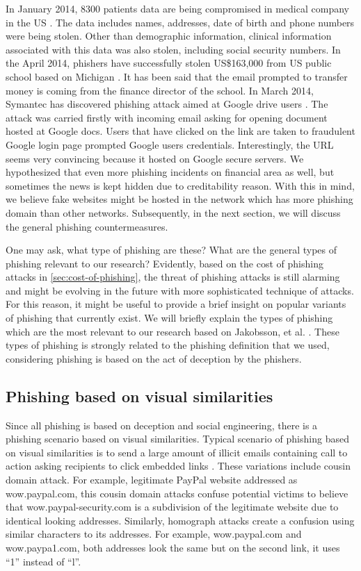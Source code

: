 In January 2014, 8300 patients data are being compromised in medical
company in the US \citep{adam:2014}. The data includes names, addresses,
date of birth and phone numbers were being stolen. Other than demographic
information, clinical information associated with this data was also
stolen, including social security numbers. In the April 2014, phishers
have successfully stolen US\$163,000 from US public school based on
Michigan \citep{ashley:2014}. It has been said that the email prompted
to transfer money is coming from the finance director of the school.
In March 2014, Symantec has discovered phishing attack aimed at Google
drive users \citep{teri:2014}. The attack was carried firstly with
incoming email asking for opening document hosted at Google docs.
Users that have clicked on the link are taken to fraudulent Google
login page prompted Google users credentials. Interestingly, the URL
seems very convincing because it hosted on Google secure servers.
We hypothesized that even more phishing incidents on financial area
as well, but sometimes the news is kept hidden due to creditability
reason. With this in mind, we believe fake websites might be hosted
in the network which has more phishing domain than other networks.
Subsequently, in the next section, we will discuss the general phishing
countermeasures. 

One may ask, what type of phishing are these? What are the general
types of phishing relevant to our research? Evidently, based on the
cost of phishing attacks in \autoref{sec:cost-of-phishing}, the threat
of phishing attacks is still alarming and might be evolving in the
future with more sophisticated technique of attacks. For this reason,
it might be useful to provide a brief insight on popular variants
of phishing that currently exist. We will briefly explain the types
of phishing which are the most relevant to our research based on Jakobsson,
et al. \citep{jakobsson:2006}. These types of phishing is strongly
related to the phishing definition that we used, considering phishing
is based on the act of deception by the phishers. 


\subsection{Phishing based on visual similarities}

Since all phishing is based on deception and social engineering, there
is a phishing scenario based on visual similarities. Typical scenario
of phishing based on visual similarities is to send a large amount
of illicit emails containing call to action asking recipients to click
embedded links \citep{jakobsson:2006}. These variations include cousin
domain attack. For example, legitimate PayPal website addressed as
wow.paypal.com, this cousin domain attacks confuse potential victims
to believe that wow.paypal-security.com is a subdivision of the legitimate
website due to identical looking addresses. Similarly, homograph attacks
create a confusion using similar characters to its addresses. For
example, wow.paypal.com and wow.paypa1.com, both addresses look the
same but on the second link, it uses \textquotedblleft 1\textquotedblright{}
instead of \textquotedblleft l\textquotedblright . 

